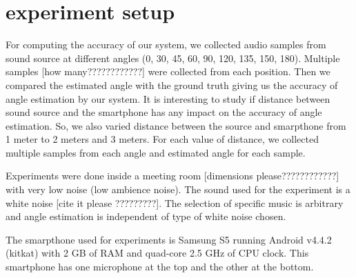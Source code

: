 \section{experiment setup}
For computing the accuracy of our system, we collected audio samples from sound source at different angles (0, 30, 45, 60, 90, 120, 135, 150, 180). Multiple samples [how many????????????] were collected from each position. Then we compared the estimated angle with the ground truth giving us the accuracy of angle estimation by our system. It is interesting to study if distance between sound source and the smartphone has any impact on the accuracy of angle estimation. So, we also varied distance between the source and smarpthone from 1 meter to 2 meters and 3 meters. For each value of distance, we collected multiple samples from each angle and estimated angle for each sample. 

Experiments were done inside a meeting room [dimensions please????????????] with very low noise (low ambience noise). The sound used for the experiment is a white noise [cite it please ?????????]. The selection of specific music is arbitrary and angle estimation is independent of type of white noise chosen.

The smarpthone used for experiments is Samsung S5 running Android v4.4.2 (kitkat) with 2 GB of RAM and quad-core 2.5 GHz of CPU clock. This smartphone has one microphone at the top and the other at the bottom.